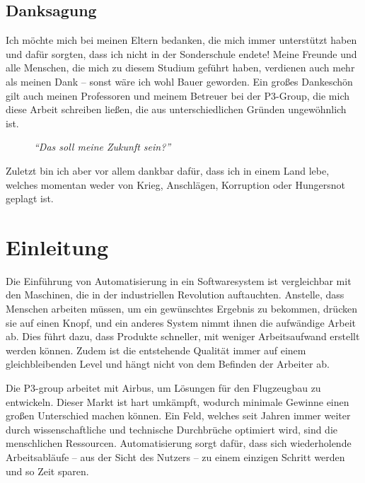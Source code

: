   \subsection*{Danksagung}
  \label{ssec:Danksagung}
    Ich möchte mich bei meinen Eltern bedanken, die mich immer unterstützt haben und dafür sorgten, dass ich nicht in der Sonderschule endete! Meine Freunde und alle Menschen, die mich zu diesem Studium geführt haben, verdienen auch mehr als meinen Dank -- sonst wäre ich wohl Bauer geworden. Ein großes Dankeschön gilt auch meinen Professoren und meinem Betreuer bei der P3-Group, die mich diese Arbeit schreiben ließen, die aus unterschiedlichen Gründen ungewöhnlich ist.
    \begin{figure}[H]
      \centering
      \caption{\textit{``Das soll meine Zukunft sein?''}}
    \end{figure}

    Zuletzt bin ich aber vor allem dankbar dafür, dass ich in einem Land lebe, welches momentan weder von Krieg, Anschlägen, Korruption oder Hungersnot geplagt ist.

\section{Einleitung}
\label{sec:Einleitung}
  Die Einführung von Automatisierung in ein Softwaresystem ist vergleichbar mit den Maschinen, die in der industriellen Revolution auftauchten. Anstelle, dass Menschen arbeiten müssen, um ein gewünschtes Ergebnis zu bekommen, drücken sie auf einen Knopf, und ein anderes System nimmt ihnen die aufwändige Arbeit ab. Dies führt dazu, dass Produkte schneller, mit weniger Arbeitsaufwand erstellt werden können. Zudem ist die entstehende Qualität immer auf einem gleichbleibenden Level und hängt nicht von dem Befinden der Arbeiter ab.

  Die P3-group arbeitet mit Airbus, um Lösungen für den Flugzeugbau zu entwickeln. Dieser Markt ist hart umkämpft, wodurch minimale Gewinne einen großen Unterschied machen können. Ein Feld, welches seit Jahren immer weiter durch wissenschaftliche und technische Durchbrüche optimiert wird, sind die menschlichen Ressourcen. Automatisierung sorgt dafür, dass sich wiederholende Arbeitsabläufe -- aus der Sicht des Nutzers -- zu einem einzigen Schritt werden und so Zeit sparen.

